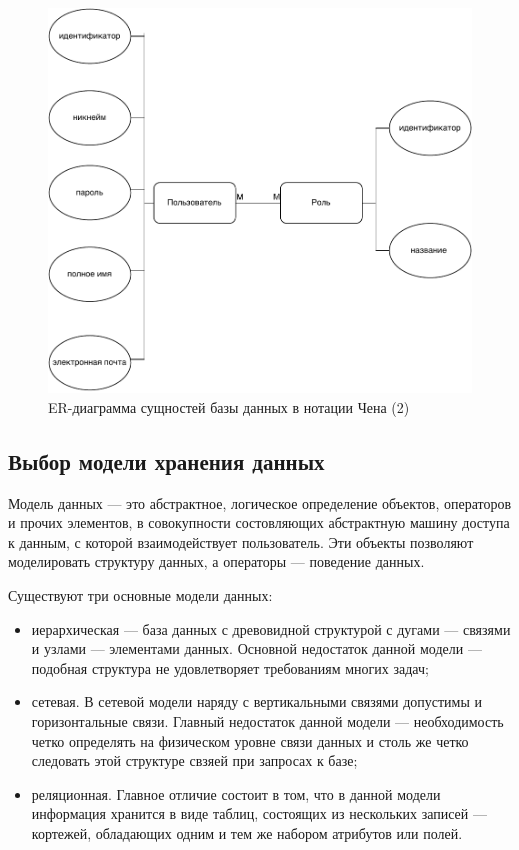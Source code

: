 \begin{figure}[h!]
	\begin{center}
		\includegraphics[scale=0.8]{img/er2.pdf}
	\end{center}
	\captionsetup{justification=centering}
	\caption{ER-диаграмма сущностей базы данных в нотации Чена (2)}
	\label{img:er2}
\end{figure}



\subsection{Выбор модели хранения данных}

Модель данных --- это абстрактное, логическое определение объектов, операторов и прочих элементов, в совокупности состовляющих абстрактную машину доступа к данным, с которой взаимодействует пользователь. Эти объекты позволяют моделировать структуру данных, а операторы --- поведение данных. 

Существуют три основные модели данных:

\begin{itemize}
	\item иерархическая --- база данных с древовидной структурой с дугами --- связями и узлами --- элементами данных. Основной недостаток данной модели --- подобная структура не удовлетворяет требованиям многих задач;
 	\item сетевая. В сетевой модели наряду с вертикальными связями допустимы и горизонтальные связи. Главный недостаток данной модели --- необходимость четко определять на физическом уровне связи данных и столь же четко следовать этой структуре свзяей при запросах к базе;
  	\item реляционная. Главное отличие состоит в том, что в данной модели информация хранится в виде таблиц, состоящих из нескольких записей --- кортежей, обладающих одним и тем же набором атрибутов или полей.  
\end{itemize}

